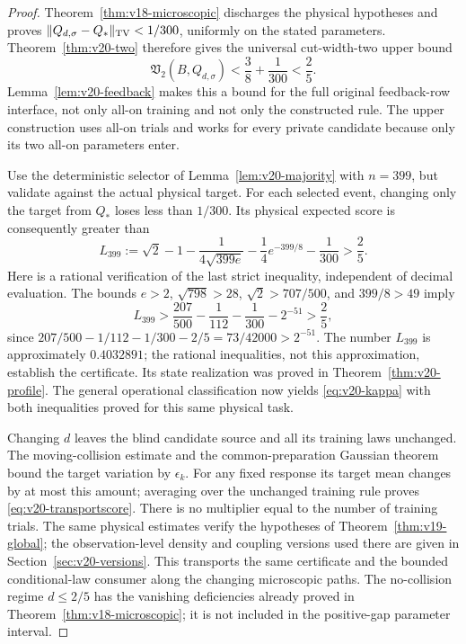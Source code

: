 \begin{proof}
Theorem~\ref{thm:v18-microscopic} discharges the physical hypotheses and
proves $\|Q_{d,\sigma}-Q_*\|_{\rm TV}<1/300$, uniformly on the stated
parameters. Theorem~\ref{thm:v20-two} therefore gives the universal
cut-width-two upper bound
\[
 \mathfrak V_2(B,Q_{d,\sigma})<\frac38+\frac1{300}<\frac25.
\]
Lemma~\ref{lem:v20-feedback} makes this a bound for the full original
feedback-row interface, not only all-on training and not only the
constructed rule. The upper construction uses all-on trials and works
for every private candidate because only its two all-on parameters enter.

Use the deterministic selector of Lemma~\ref{lem:v20-majority} with
$n=399$, but validate against the actual physical target. For each
selected event, changing only the target from $Q_*$ loses less than
$1/300$. Its physical expected score is consequently greater than
\begin{equation}\label{eq:v20-certifiedscore}
 L_{399}:=\sqrt2-1-\frac1{4\sqrt{399e}}
                       -\frac14e^{-399/8}-\frac1{300}>\frac25.
\end{equation}
Here is a rational verification of the last strict inequality, independent
of decimal evaluation. The bounds $e>2$, $\sqrt{798}>28$,
$\sqrt2>707/500$, and $399/8>49$ imply
\[
 L_{399}>\frac{207}{500}-\frac1{112}-\frac1{300}-2^{-51}
                >\frac25,
\]
since $207/500-1/112-1/300-2/5=73/42000>2^{-51}$.
The number $L_{399}$ is approximately $0.4032891$; the rational inequalities,
not this approximation, establish the certificate. Its state realization
was proved in Theorem~\ref{thm:v20-profile}. The general operational
classification now yields \eqref{eq:v20-kappa} with both inequalities
proved for this same physical task.

Changing $d$ leaves the blind candidate source and all its training laws
unchanged. The moving-collision estimate and the common-preparation
Gaussian theorem bound the target variation by $\epsilon_k$.
For any fixed response its target mean changes by at most this amount;
averaging over the unchanged training rule proves
\eqref{eq:v20-transportscore}. There is no multiplier equal to the number
of training trials. The same physical estimates verify the hypotheses of
Theorem~\ref{thm:v19-global}; the observation-level density and coupling
versions used there are given in Section~\ref{sec:v20-versions}.
This transports the same certificate and the bounded conditional-law
consumer along the changing microscopic paths. The no-collision regime
$d\le2/5$ has the vanishing deficiencies already proved in
Theorem~\ref{thm:v18-microscopic}; it is not included in the positive-gap
parameter interval.
\end{proof}

